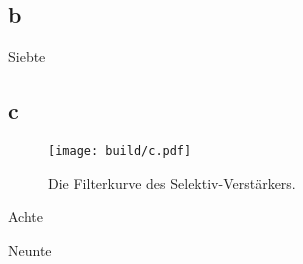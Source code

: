 \subsection{b}
\begin{table}
	\caption{Siebte}
	\centering
	
\end{table}


\subsection{c}
\begin{figure}
	\centering
	\caption{Die Filterkurve des Selektiv-Verstärkers.}
	\texttt{[image: build/c.pdf]}
	\label{fig:GraphSelektiv}
\end{figure}
\begin{table}
	\caption{Achte}
	\centering
	
\end{table}

\begin{table}
	\caption{Neunte}
	\centering
	
\end{table}


